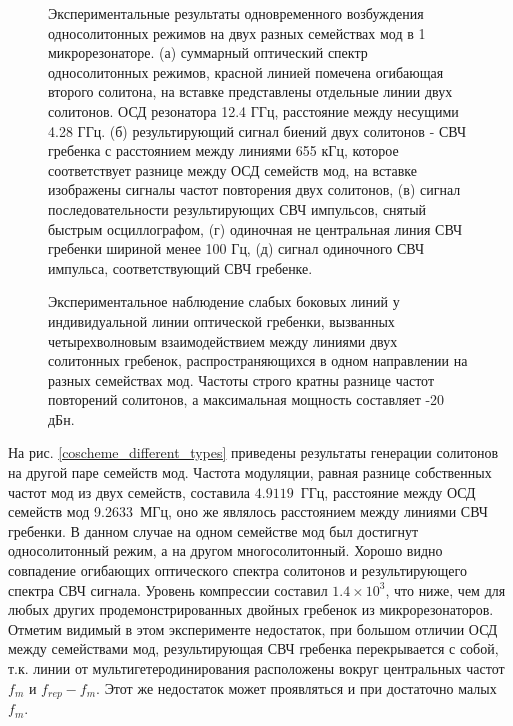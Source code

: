 \begin{figure}[!htb]
\begin{minipage}{1\linewidth}
\end{minipage}
\caption{Экспериментальные результаты одновременного возбуждения односолитонных режимов на двух разных семействах мод в 1 микрорезонаторе. (а) суммарный оптический спектр односолитонных режимов, красной линией помечена огибающая второго солитона, на вставке представлены отдельные линии двух солитонов. ОСД резонатора 12.4 ГГц, расстояние между несущими 4.28 ГГц. (б) результирующий сигнал биений двух солитонов - СВЧ гребенка с расстоянием между линиями 655 кГц, которое соответствует разнице между ОСД семейств мод, на вставке изображены сигналы частот повторения двух солитонов, (в) сигнал последовательности результирующих СВЧ импульсов, снятый быстрым осциллографом, (г) одиночная не центральная линия СВЧ гребенки шириной менее 100 Гц, (д) сигнал одиночного СВЧ импульса, соответствующий СВЧ гребенке.}
\label{Co_Scheme_results}
\end{figure}

\begin{figure}[!htb]
\begin{minipage}{1\linewidth}
\end{minipage}
\caption{Экспериментальное наблюдение слабых боковых линий у индивидуальной линии оптической гребенки, вызванных четырехволновым взаимодействием между линиями двух солитонных гребенок, распространяющихся в одном направлении на разных семействах мод. Частоты строго кратны разнице частот повторений солитонов, а максимальная мощность составляет -20 дБн.}
\label{fig4_intermodulation}
\end{figure}

На рис. \ref{coscheme_different_types} приведены результаты генерации солитонов на другой паре семейств мод. Частота модуляции, равная разнице собственных частот мод из двух семейств, составила $4.9119$~ГГц, расстояние между ОСД семейств мод 9.2633~МГц, оно же являлось расстоянием между линиями СВЧ гребенки. В данном случае на одном семействе мод был достигнут односолитонный режим, а на другом многосолитонный. Хорошо видно совпадение огибающих оптического спектра солитонов и результирующего спектра СВЧ сигнала. Уровень компрессии составил $1.4\times10^3$, что ниже, чем для любых других продемонстрированных двойных гребенок из микрорезонаторов. Отметим видимый в этом эксперименте недостаток, при большом отличии ОСД между семействами мод, результирующая СВЧ гребенка перекрывается с собой, т.к. линии от мультигетеродинирования расположены вокруг центральных частот $f_m$ и $f_{rep}-f_m$. Этот же недостаток может проявляться и при достаточно малых $f_m$.

